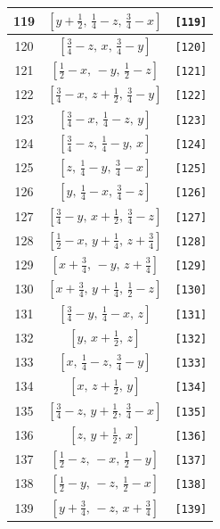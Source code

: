 \documentclass[fleqn,8pt]{jsarticle}
\begin{document}
\begin{longtable}{ccc}
119 & $\left[ y + \frac{1}{2},\, \frac{1}{4} - z,\, \frac{3}{4} - x \right]$ & {\tt [119]} \\ \hline
120 & $\left[ \frac{3}{4} - z,\, x,\, \frac{3}{4} - y \right]$ & {\tt [120]} \\ \hline
121 & $\left[ \frac{1}{2} - x,\, - y,\, \frac{1}{2} - z \right]$ & {\tt [121]} \\ \hline
122 & $\left[ \frac{3}{4} - x,\, z + \frac{1}{2},\, \frac{3}{4} - y \right]$ & {\tt [122]} \\ \hline
123 & $\left[ \frac{3}{4} - x,\, \frac{1}{4} - z,\, y \right]$ & {\tt [123]} \\ \hline
124 & $\left[ \frac{3}{4} - z,\, \frac{1}{4} - y,\, x \right]$ & {\tt [124]} \\ \hline
125 & $\left[ z,\, \frac{1}{4} - y,\, \frac{3}{4} - x \right]$ & {\tt [125]} \\ \hline
126 & $\left[ y,\, \frac{1}{4} - x,\, \frac{3}{4} - z \right]$ & {\tt [126]} \\ \hline
127 & $\left[ \frac{3}{4} - y,\, x + \frac{1}{2},\, \frac{3}{4} - z \right]$ & {\tt [127]} \\ \hline
128 & $\left[ \frac{1}{2} - x,\, y + \frac{1}{4},\, z + \frac{3}{4} \right]$ & {\tt [128]} \\ \hline
129 & $\left[ x + \frac{3}{4},\, - y,\, z + \frac{3}{4} \right]$ & {\tt [129]} \\ \hline
130 & $\left[ x + \frac{3}{4},\, y + \frac{1}{4},\, \frac{1}{2} - z \right]$ & {\tt [130]} \\ \hline
131 & $\left[ \frac{3}{4} - y,\, \frac{1}{4} - x,\, z \right]$ & {\tt [131]} \\ \hline
132 & $\left[ y,\, x + \frac{1}{2},\, z \right]$ & {\tt [132]} \\ \hline
133 & $\left[ x,\, \frac{1}{4} - z,\, \frac{3}{4} - y \right]$ & {\tt [133]} \\ \hline
134 & $\left[ x,\, z + \frac{1}{2},\, y \right]$ & {\tt [134]} \\ \hline
135 & $\left[ \frac{3}{4} - z,\, y + \frac{1}{2},\, \frac{3}{4} - x \right]$ & {\tt [135]} \\ \hline
136 & $\left[ z,\, y + \frac{1}{2},\, x \right]$ & {\tt [136]} \\ \hline
137 & $\left[ \frac{1}{2} - z,\, - x,\, \frac{1}{2} - y \right]$ & {\tt [137]} \\ \hline
138 & $\left[ \frac{1}{2} - y,\, - z,\, \frac{1}{2} - x \right]$ & {\tt [138]} \\ \hline
139 & $\left[ y + \frac{3}{4},\, - z,\, x + \frac{3}{4} \right]$ & {\tt [139]} \\ \hline

\end{longtable}
\end{document}
